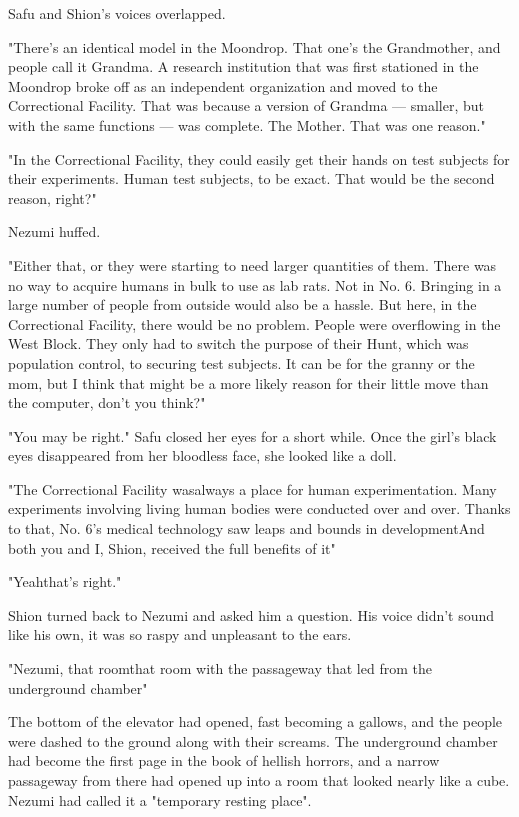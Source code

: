 Safu and Shion's voices overlapped.

"There's an identical model in the Moondrop. That one's the Grandmother,
and people call it Grandma. A research institution that was first
stationed in the Moondrop broke off as an independent organization and
moved to the Correctional Facility. That was because a version of
Grandma --- smaller, but with the same functions --- was complete. The
Mother. That was one reason."

"In the Correctional Facility, they could easily get their hands on test
subjects for their experiments. Human test subjects, to be exact. That
would be the second reason, right?"

Nezumi huffed.

"Either that, or they were starting to need larger quantities of them.
There was no way to acquire humans in bulk to use as lab rats. Not in
No. 6. Bringing in a large number of people from outside would also be a
hassle. But here, in the Correctional Facility, there would be no
problem. People were overflowing in the West Block. They only had to
switch the purpose of their Hunt, which was population control, to
securing test subjects. It can be for the granny or the mom, but I think
that might be a more likely reason for their little move than the
computer, don't you think?"

"You may be right." Safu closed her eyes for a short while. Once the
girl's black eyes disappeared from her bloodless face, she looked like a
doll.

"The Correctional Facility was\el always a place for human
experimentation. Many experiments involving living human bodies were
conducted over and over. Thanks to that, No. 6's medical technology saw
leaps and bounds in development\el And both you and I, Shion, received
the full benefits of it\el "

"Yeah\el that's right."

Shion turned back to Nezumi and asked him a question. His voice didn't
sound like his own, it was so raspy and unpleasant to the ears.

"Nezumi, that room\el that room with the passageway that led from the
underground chamber\el "

The bottom of the elevator had opened, fast becoming a gallows, and the
people were dashed to the ground along with their screams. The
underground chamber had become the first page in the book of hellish
horrors, and a narrow passageway from there had opened up into a room
that looked nearly like a cube. Nezumi had called it a "temporary
resting place".

